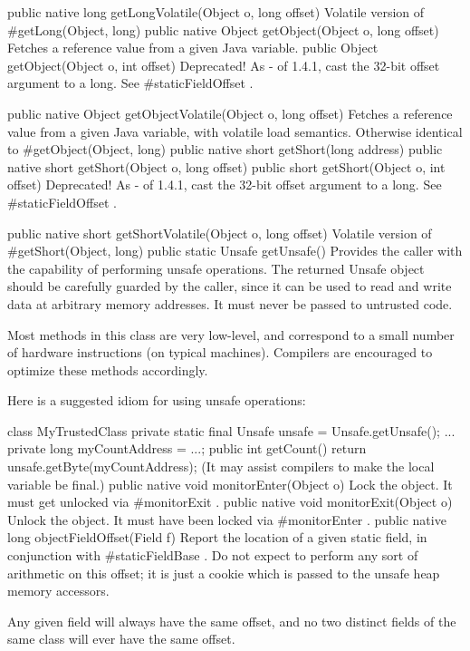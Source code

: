  public native long getLongVolatile(Object o,
    long offset)
Volatile version of #getLong(Object, long) 
 public native Object getObject(Object o,
    long offset)
Fetches a reference value from a given Java variable.
 public Object getObject(Object o,
    int offset) 
Deprecated! As - of 1.4.1, cast the 32-bit offset argument to a long. See #staticFieldOffset .

 public native Object getObjectVolatile(Object o,
    long offset)
Fetches a reference value from a given Java variable, with volatile
load semantics. Otherwise identical to #getObject(Object, long) 
 public native short getShort(long address)
 public native short getShort(Object o,
    long offset)
 public short getShort(Object o,
    int offset) 
Deprecated! As - of 1.4.1, cast the 32-bit offset argument to a long. See #staticFieldOffset .

 public native short getShortVolatile(Object o,
    long offset)
Volatile version of #getShort(Object, long) 
 public static Unsafe getUnsafe() 
Provides the caller with the capability of performing unsafe operations.
The returned Unsafe object should be carefully guarded by the caller, since it can be used to read and write data at arbitrary memory addresses. It must never be passed to untrusted code.

Most methods in this class are very low-level, and correspond to a small number of hardware instructions (on typical machines). Compilers are encouraged to optimize these methods accordingly.

Here is a suggested idiom for using unsafe operations:

class MyTrustedClass {
  private static final Unsafe unsafe = Unsafe.getUnsafe();
  ...
  private long myCountAddress = ...;
  public int getCount() { return unsafe.getByte(myCountAddress); }
}
(It may assist compilers to make the local variable be final.)
 public native  void monitorEnter(Object o)
Lock the object.  It must get unlocked via #monitorExit .
 public native  void monitorExit(Object o)
Unlock the object.  It must have been locked via #monitorEnter .
 public native long objectFieldOffset(Field f)
Report the location of a given static field, in conjunction with #staticFieldBase .
Do not expect to perform any sort of arithmetic on this offset;
it is just a cookie which is passed to the unsafe heap memory accessors.


Any given field will always have the same offset, and no two distinct
fields of the same class will ever have the same offset.


